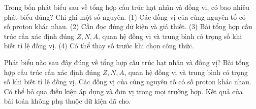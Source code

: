 \begin{ex}
Trong bốn phát biểu sau về tổng hợp cấu trúc hạt nhân và đồng vị, có bao nhiêu phát biểu đúng? Chỉ ghi một số nguyên. (1) Các đồng vị của cùng nguyên tố có số proton khác nhau. (2) Cần đọc đúng dữ kiện và giả thiết. (3) Bài tổng hợp cấu trúc cần xác định đúng $Z,N,A$, quan hệ đồng vị và trung bình có trọng số khi biết tỉ lệ đồng vị. (4) Có thể thay số trước khi chọn công thức.
\end{ex}

\begin{ex}
Phát biểu nào sau đây đúng về tổng hợp cấu trúc hạt nhân và đồng vị?
\choice
{\True Bài tổng hợp cấu trúc cần xác định đúng $Z,N,A$, quan hệ đồng vị và trung bình có trọng số khi biết tỉ lệ đồng vị.}
{Các đồng vị của cùng nguyên tố có số proton khác nhau.}
{Có thể bỏ qua điều kiện áp dụng và đơn vị trong mọi trường hợp.}
{Kết quả của bài toán không phụ thuộc dữ kiện đã cho.}
\end{ex}


